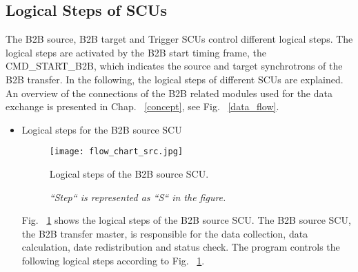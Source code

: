 \subsection{Logical Steps of SCUs}
\label{sec_firmware}
The B2B source, B2B target and Trigger SCUs control different logical steps. The logical steps are activated by the B2B start timing frame, the CMD\_START\_B2B, which indicates the source and target synchrotrons of the B2B transfer. In the following, the logical steps of different SCUs are explained. An overview of the connections of the B2B related modules used for the data exchange is presented in Chap. ~\ref{concept}, see Fig. ~\ref{data_flow}.
\begin{itemize}
\item Logical steps for the B2B source SCU
\begin{figure}[!htb]
   \centering   
   \texttt{[image: flow\_chart\_src.jpg]}
   \caption{Logical steps of the B2B source SCU.}
   \caption*{\textsl{\small{``Step`` is represented as ``S`` in the figure.  }}}
   \label{flow_chart_src}
\end{figure}

Fig. ~\ref{flow_chart_src} shows the logical steps of the B2B source SCU. The B2B source SCU, the B2B transfer master, is responsible for the data collection, data calculation, date redistribution and status check. The program controls the following logical steps according to Fig. ~\ref{flow_chart_src}.


\end{itemize}
